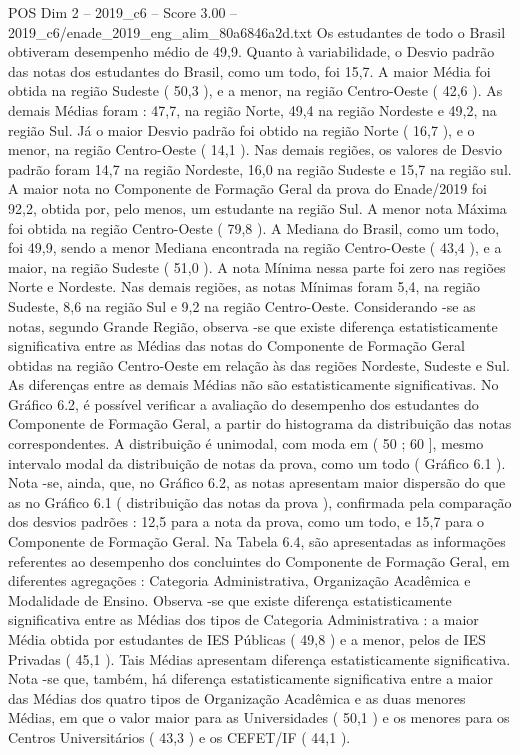 \begin{textsample}{POS Dim 2 – 2019\_c6 – Score 3.00 – 2019\_c6/enade\_2019\_eng\_alim\_80a6846a2d.txt}
Os estudantes de todo o Brasil obtiveram desempenho médio de 49,9.
Quanto à variabilidade, o Desvio padrão das notas dos estudantes do Brasil, como um todo, foi 15,7.
A maior Média foi obtida na região Sudeste ( 50,3 ), e a menor, na região Centro-Oeste ( 42,6 ).
As demais Médias foram : 47,7, na região Norte, 49,4 na região Nordeste e 49,2, na região Sul.
Já o maior Desvio padrão foi obtido na região Norte ( 16,7 ), e o menor, na região Centro-Oeste ( 14,1 ).
Nas demais regiões, os valores de Desvio padrão foram 14,7 na região Nordeste, 16,0 na região Sudeste e 15,7 na região sul.
A maior nota no Componente de Formação Geral da prova do Enade/2019 foi 92,2, obtida por, pelo menos, um estudante na região Sul.
A menor nota Máxima foi obtida na região Centro-Oeste ( 79,8 ).
A Mediana do Brasil, como um todo, foi 49,9, sendo a menor Mediana encontrada na região Centro-Oeste ( 43,4 ), e a maior, na região Sudeste ( 51,0 ).
A nota Mínima nessa parte foi zero nas regiões Norte e Nordeste.
Nas demais regiões, as notas Mínimas foram 5,4, na região Sudeste, 8,6 na região Sul e 9,2 na região Centro-Oeste.
Considerando -se as notas, segundo Grande Região, observa -se que existe diferença estatisticamente significativa entre as Médias das notas do Componente de Formação Geral obtidas na região Centro-Oeste em relação às das regiões Nordeste, Sudeste e Sul.
As diferenças entre as demais Médias não são estatisticamente significativas.
No Gráfico 6.2, é possível verificar a avaliação do desempenho dos estudantes do Componente de Formação Geral, a partir do histograma da distribuição das notas correspondentes.
A distribuição é unimodal, com moda em ( 50 ; 60 ], mesmo intervalo modal da distribuição de notas da prova, como um todo ( Gráfico 6.1 ).
Nota -se, ainda, que, no Gráfico 6.2, as notas apresentam maior dispersão do que as no Gráfico 6.1 ( distribuição das notas da prova ), confirmada pela comparação dos desvios padrões : 12,5 para a nota da prova, como um todo, e 15,7 para o Componente de Formação Geral.
Na Tabela 6.4, são apresentadas as informações referentes ao desempenho dos concluintes do Componente de Formação Geral, em diferentes agregações : Categoria Administrativa, Organização Acadêmica e Modalidade de Ensino.
Observa -se que existe diferença estatisticamente significativa entre as Médias dos tipos de Categoria Administrativa : a maior Média obtida por estudantes de IES Públicas ( 49,8 ) e a menor, pelos de IES Privadas ( 45,1 ).
Tais Médias apresentam diferença estatisticamente significativa.
Nota -se que, também, há diferença estatisticamente significativa entre a maior das Médias dos quatro tipos de Organização Acadêmica e as duas menores Médias, em que o valor maior para as Universidades ( 50,1 ) e os menores para os Centros Universitários ( 43,3 ) e os CEFET/IF ( 44,1 ).

\end{textsample}
